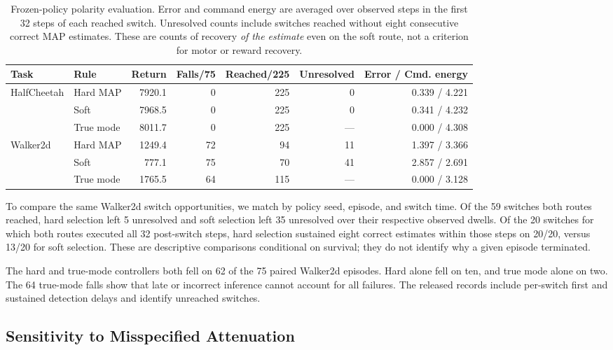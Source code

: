 \begin{table}[t]
\centering
\small
\setlength{\tabcolsep}{4pt}
\caption{Frozen-policy polarity evaluation. Error and command energy are averaged over observed steps in the first 32 steps of each reached switch. Unresolved counts include switches reached without eight consecutive correct MAP estimates. These are counts of recovery \emph{of the estimate} even on the soft route, not a criterion for motor or reward recovery.}
\label{tab:frozen_interface}
\begin{tabular}{llrrrrr}
\toprule
Task & Rule & Return & Falls/75 & Reached/225 & Unresolved & Error / Cmd. energy \\
\midrule
HalfCheetah & Hard MAP & 7920.1 & 0 & 225 & 0 & 0.339 / 4.221 \\
 & Soft & 7968.5 & 0 & 225 & 0 & 0.341 / 4.232 \\
 & True mode & 8011.7 & 0 & 225 & --- & 0.000 / 4.308 \\
Walker2d & Hard MAP & 1249.4 & 72 & 94 & 11 & 1.397 / 3.366 \\
 & Soft & 777.1 & 75 & 70 & 41 & 2.857 / 2.691 \\
 & True mode & 1765.5 & 64 & 115 & --- & 0.000 / 3.128 \\
\bottomrule
\end{tabular}
\end{table}

To compare the same Walker2d switch opportunities, we match by policy seed, episode, and switch time. Of the 59 switches both routes reached, hard selection left 5 unresolved and soft selection left 35 unresolved over their respective observed dwells. Of the 20 switches for which both routes executed all 32 post-switch steps, hard selection sustained eight correct estimates within those steps on 20/20, versus 13/20 for soft selection. These are descriptive comparisons conditional on survival; they do not identify why a given episode terminated.

The hard and true-mode controllers both fell on 62 of the 75 paired Walker2d episodes. Hard alone fell on ten, and true mode alone on two. The 64 true-mode falls show that late or incorrect inference cannot account for all failures. The released records include per-switch first and sustained detection delays and identify unreached switches.

\subsection{Sensitivity to Misspecified Attenuation}
\label{sec:gain_mismatch}

